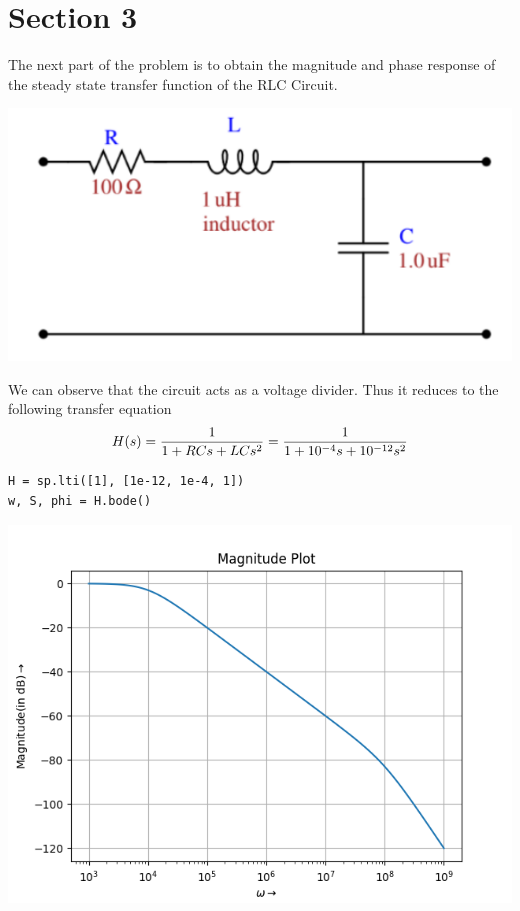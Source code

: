 \documentclass[12pt, a4paper]{report}
\begin{document}
\section*{Section 3}
The next part of the problem is to obtain the magnitude and phase response of the steady state transfer function of the RLC Circuit.

\begin{center}
	\includegraphics[scale=0.6]{Figure_17} 
	\label{fig:rawdata}
\end{center}

We can observe that the circuit acts as a voltage divider. Thus it reduces to the following transfer equation
\begin{equation*}
H(s) = \frac{1}{1 + RCs + LCs^2} = \frac{1}{1 + 10^{-4}s + 10^{-12}s^2}\\
\end{equation*}

\begin{verbatim}
H = sp.lti([1], [1e-12, 1e-4, 1])
w, S, phi = H.bode()
\end{verbatim}

\begin{center}
	\includegraphics[scale=0.8]{Figure_15} 
	\label{fig:rawdata}
\end{center}
\end{document}
